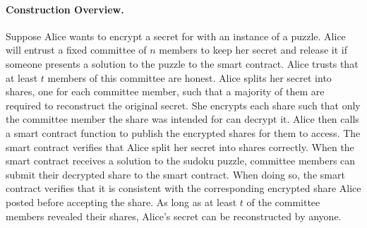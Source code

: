 \paragraph{Construction Overview.}
Suppose Alice wants to encrypt a secret for with an instance of a puzzle.
Alice will entrust a fixed committee of $n$ members to keep her secret and release it if someone presents a solution to the puzzle to the smart contract.
Alice trusts that at least $t$ members of this committee are honest.
Alice splits her secret into shares, one for each committee member, such that a majority of them are required to reconstruct the original secret.
She encrypts each share such that only the committee member the share was intended for can decrypt it.
Alice then calls a smart contract function to publish the encrypted shares for them to access.
The smart contract verifies that Alice split her secret into shares correctly.
When the smart contract receives a solution to the sudoku puzzle, committee members can submit their decrypted share to the smart contract.
When doing so, the smart contract verifies that it is consistent with the corresponding encrypted share Alice posted before accepting the share.
As long as at least $t$ of the committee members revealed their shares, Alice's secret can be reconstructed by anyone.